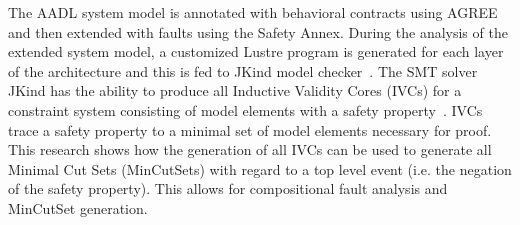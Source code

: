 The AADL system model is annotated with behavioral contracts using AGREE and then extended with faults using the Safety Annex. During the analysis of the extended system model, a customized Lustre program is generated for each layer of the architecture and this is fed to JKind model checker~\cite{2017arXiv171201222G}. The SMT solver JKind has the ability to produce all Inductive Validity Cores (IVCs) for a constraint system consisting of model elements with a safety property~\cite{GhassabaniGW16,Ghassabani2017EfficientGO}. IVCs trace a safety property to a minimal set of model elements necessary for proof. This research shows how the generation of all IVCs can be used to generate all Minimal Cut Sets (MinCutSets) with regard to a top level event (i.e. the negation of the safety property). This allows for compositional fault analysis and MinCutSet generation.







